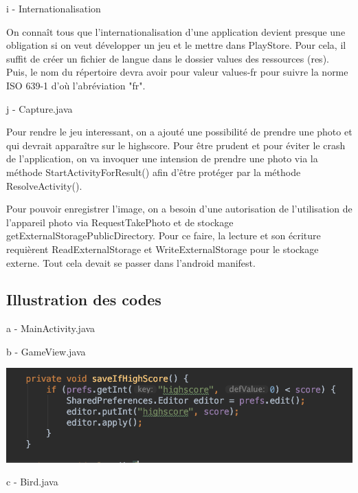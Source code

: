 \documentclass{rapportECL}
\begin{document}
i - Internationalisation

On connaît tous que l'internationalisation d'une application devient presque une obligation si on veut développer un jeu et le mettre dans PlayStore. Pour cela, il suffit de créer un fichier de langue dans le dossier values des ressources (res). Puis, le nom du répertoire devra avoir pour valeur values-fr pour suivre la norme ISO 639-1 d'où l'abréviation "fr".\newline

j - Capture.java

Pour rendre le jeu interessant, on a ajouté une possibilité de prendre une photo et qui devrait apparaître sur le highscore. Pour être prudent et pour éviter le crash de l'application, on va invoquer une intension de prendre une photo via la méthode StartActivityForResult()\cite{AndroidStudio} afin d'être protéger par la méthode ResolveActivity().

Pour pouvoir enregistrer l'image, on a besoin d'une autorisation de l'utilisation de l'appareil photo via RequestTakePhoto\cite{AndroidStudio} et de stockage getExternalStoragePublicDirectory. Pour ce faire, la lecture et son écriture requièrent ReadExternalStorage et WriteExternalStorage pour le stockage externe. Tout cela devait se passer dans l'android manifest.\newline

\subsection{Illustration des codes}

a - MainActivity.java


b - GameView.java 

\begin{center}
    \includegraphics[scale = 0.5]{logos/GameView.png}
\end{center}

c - Bird.java
\end{document}
